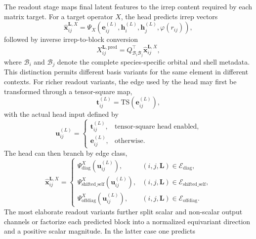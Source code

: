 \documentclass[preprint,12pt,compress,numafflabel]{elsarticle}
\begin{document}
The readout stage maps final latent features to the irrep content required by each matrix target.
For a target operator $X$, the head predicts irrep vectors
\begin{equation}
\widehat{\bm{x}}_{ij}^{\bm{L},X}
=
\Psi_X\!\left(
\bm{e}_{ij}^{(L)},
\bm{h}_i^{(L)},
\bm{h}_j^{(L)},
\varphi(r_{ij})
\right),
\end{equation}
followed by inverse irrep-to-block conversion
\begin{equation}
X_{ij}^{\bm{L},\mathrm{pred}}
=
Q_{\mathcal{B}_i\mathcal{B}_j}^{\top}\widehat{\bm{x}}_{ij}^{\bm{L},X},
\end{equation}
where $\mathcal{B}_i$ and $\mathcal{B}_j$ denote the complete species-specific orbital and shell metadata. This distinction permits different basis variants for the same element in different contexts.
For richer readout variants, the edge used by the head may first be transformed through a tensor-square map,
\begin{equation}
\bm{t}_{ij}^{(L)}
=
\mathrm{TS}\!\left(\bm{e}_{ij}^{(L)}\right),
\end{equation}
with the actual head input defined by
\begin{equation}
\bm{u}_{ij}^{(L)}
=
\begin{cases}
\bm{t}_{ij}^{(L)}, & \text{tensor-square head enabled},\\
\bm{e}_{ij}^{(L)}, & \text{otherwise}.
\end{cases}
\end{equation}
The head can then branch by edge class,
\begin{equation}
\widehat{\bm{x}}_{ij}^{\bm{L},X}
=
\begin{cases}
\Psi^{X}_{\mathrm{diag}}(\bm{u}_{ij}^{(L)}), &
(i,j,\bm{L})\in\mathcal{E}_{\mathrm{diag}}, \\
\Psi^{X}_{\mathrm{shifted\_self}}(\bm{u}_{ij}^{(L)}), &
(i,j,\bm{L})\in\mathcal{E}_{\mathrm{shifted\_self}}, \\
\Psi^{X}_{\mathrm{offdiag}}(\bm{u}_{ij}^{(L)}), &
(i,j,\bm{L})\in\mathcal{E}_{\mathrm{offdiag}}.
\end{cases}
\end{equation}
The most elaborate readout variants further split scalar and non-scalar output channels or factorize each predicted block into a normalized equivariant direction and a positive scalar magnitude. In the latter case one predicts
\end{document}
